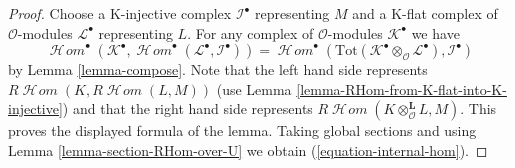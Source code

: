 \documentclass[10pt,a4paper]{amsart}
\theoremstyle{plain}
\theoremstyle{definition}
\theoremstyle{remark}
\numberwithin{equation}{subsection}
\def\SheafHom{\mathop{\mathcal{H}\!\mathit{om}}\nolimits}
\begin{document}
\begin{proof}
Choose a K-injective complex $\mathcal{I}^\bullet$ representing
$M$ and a K-flat complex of $\mathcal{O}$-modules $\mathcal{L}^\bullet$
representing $L$.
For any complex of $\mathcal{O}$-modules $\mathcal{K}^\bullet$
we have
$$
\SheafHom^\bullet(\mathcal{K}^\bullet,
\SheafHom^\bullet(\mathcal{L}^\bullet, \mathcal{I}^\bullet))
=
\SheafHom^\bullet(
\text{Tot}(\mathcal{K}^\bullet \otimes_\mathcal{O} \mathcal{L}^\bullet),
\mathcal{I}^\bullet)
$$
by Lemma \ref{lemma-compose}.
Note that the left hand side represents
$R\SheafHom(K, R\SheafHom(L, M))$ (use
Lemma \ref{lemma-RHom-from-K-flat-into-K-injective})
and that the right hand side represents
$R\SheafHom(K \otimes_\mathcal{O}^\mathbf{L} L, M)$.
This proves the displayed formula of the lemma.
Taking global sections and using Lemma \ref{lemma-section-RHom-over-U}
we obtain (\ref{equation-internal-hom}).
\end{proof}
\end{document}

